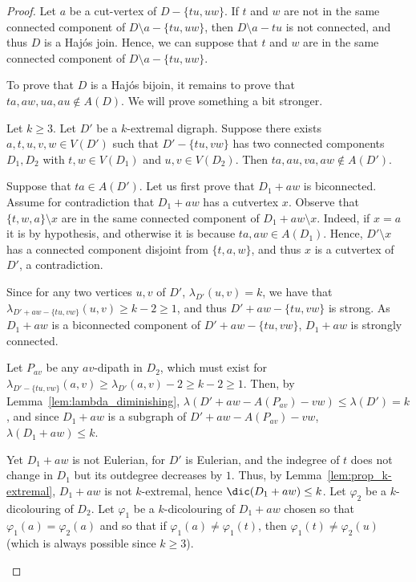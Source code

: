 \begin{proof} 
    Let $a$ be a cut-vertex of $D - \{tu,uw\}$. If $t$ and $w$ are not in the same connected component of $D \setminus a - \{tu, uw\}$, then $D \setminus a - tu$ is not connected, and thus $D$ is a Haj\'os join. Hence, we can suppose that $t$ and $w$ are in the same connected component of $D \setminus a - \{tu,uw\}$.

    To prove that $D$ is a Haj\'os bijoin, it remains to prove that $ta,aw,ua,au \notin A(D)$. We will prove something a bit stronger.

    \begin{claim}
        Let $k \geq 3$. Let $D'$ be a $k$-extremal digraph. Suppose there exists $a, t,u,v,w \in V(D')$ such that $D' - \{tu,vw\}$ has two connected components $D_1, D_2$ with $t,w \in V(D_1)$ and $u,v \in V(D_2)$. Then $ta,au,va,aw \notin A(D')$. 
    \end{claim}

    \begin{proofclaim}
        Suppose that $ta \in A(D')$. Let us first prove that $D_1 + aw$ is biconnected. Assume for contradiction that $D_1 + aw$ has a cutvertex $x$. Observe that $\{t,w,a\} \setminus x$ are in the same connected component of $D_1 + aw \setminus x$. Indeed, if $x=a$ it is by hypothesis, and otherwise it is because $ta, aw \in A(D_1)$. Hence, $D' \setminus x$ has a connected component disjoint from $\{t,a,w\}$, and thus $x$ is a cutvertex of $D'$, a contradiction.
        \smallskip 
    
        Since for any two vertices $u,v$ of $D'$, $\lambda_{D'}(u,v) = k$, we have that $\lambda_{D' + aw - \{tu,vw\}}(u,v) \geq k - 2 \geq 1$, and thus $D' + aw - \{tu,vw\}$ is strong. As $D_1 + aw$ is a biconnected component of $D' + aw - \{tu,vw\}$, $D_1 + aw$ is strongly connected.
    
        Let $P_{av}$ be any $av$-dipath in $D_2$, which must exist for $\lambda_{D' - \{tu,vw\}}(a,v) \geq \lambda_{D'}(a,v) - 2 \geq k - 2 \geq 1$. Then, by Lemma~\ref{lem:lambda_diminishing}, $\lambda(D' + aw - A(P_{av}) - vw) \leq \lambda(D') = k$, and since $D_1 + aw$ is a subgraph of $D' + aw - A(P_{av}) - vw$, $\lambda(D_1 + aw) \leq k$.
    
        Yet $D_1 + aw$ is not Eulerian, for $D'$ is Eulerian, and the indegree of $t$ does not change in $D_1$ but its outdegree decreases by $1$. Thus, by Lemma~\ref{lem:prop_k-extremal}, $D_1 + aw$ is not $k$-extremal, hence $\dic(D_1 + aw) \leq k$. Let $\varphi_2$ be a $k$-dicolouring of $D_2$. Let $\varphi_1$ be a $k$-dicolouring of $D_1 + aw$ chosen so that $\varphi_1(a) = \varphi_2(a)$ and so that if $\varphi_1(a) \neq \varphi_1(t)$, then $\varphi_1(t) \neq \varphi_2(u)$ (which is always possible since $k \geq 3$).
    

\end{proofclaim}
\end{proof}
